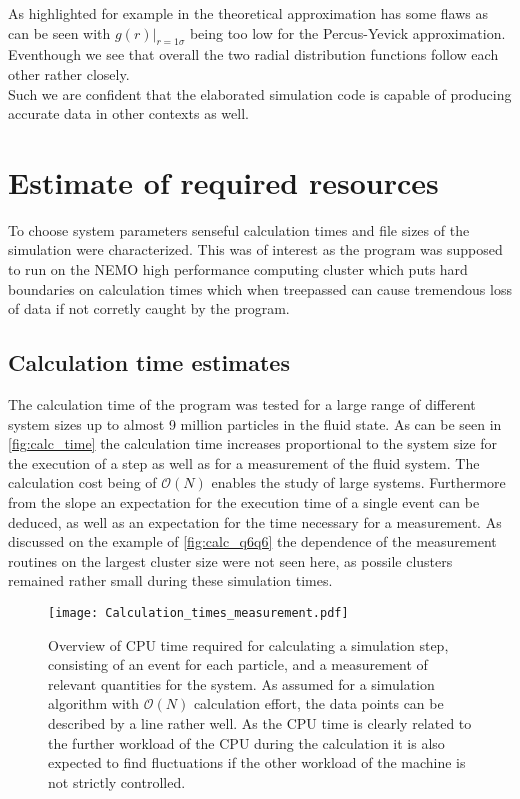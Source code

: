 As highlighted for example in \cite{Hansen2006} the theoretical approximation has some flaws as can be seen with $g(r)|_{r=1\sigma}$ being too low for the Percus-Yevick approximation. Eventhough we see that overall the two radial distribution functions follow each other rather closely.\\
Such we are confident that the elaborated simulation code is capable of producing accurate data in other contexts as well.\\


\section{Estimate of required resources}
\label{sec:resources}
To choose system parameters senseful calculation times and file sizes of the simulation were characterized. This was of interest as the program was supposed to run on the NEMO high performance computing cluster which puts hard boundaries on calculation times which when treepassed can cause tremendous loss of data if not corretly caught by the program.\\
 
\subsection{Calculation time estimates}
\label{sec:calc_times}
The calculation time of the program was tested for a large range of different system sizes up to almost 9 million particles in the fluid state. As can be seen in \autoref{fig:calc_time} the calculation time increases proportional to the system size for the execution of a step as well as for a measurement of the fluid system. The calculation cost being of $\mathcal{O}(N)$ enables the study of large systems. Furthermore from the slope an expectation for the execution time of a single event can be deduced, as well as an expectation for the time necessary for a measurement. As discussed on the example of \autoref{fig:calc_q6q6} the dependence of the measurement routines on the largest cluster size were not seen here, as possile clusters remained rather small during these simulation times.\\

\begin{figure}[h!]
\centering
\texttt{[image: Calculation\_times\_measurement.pdf]}
\caption{Overview of CPU time required for calculating a simulation step, consisting of an event for each particle, and a measurement of relevant quantities for the system. As assumed for a simulation algorithm with $\mathcal{O}(N)$ calculation effort, the data points can be described by a line rather well. As the CPU time is clearly related to the further workload of the CPU during the calculation it is also expected to find fluctuations if the other workload of the machine is not strictly controlled.}
\label{fig:calc_time}
\end{figure}


